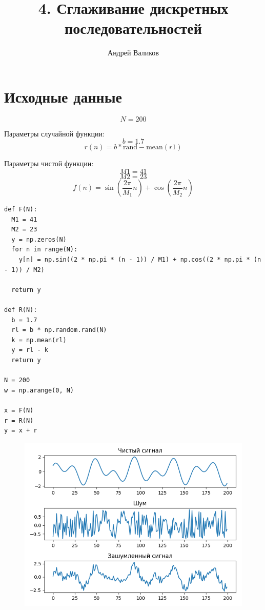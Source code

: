 \documentclass[12pt]{article}
\begin{document}
\title{4. Сглаживание дискретных последовательностей}
\author{Андрей Валиков}
\date{}
\maketitle
																																																								\section{Исходные данные}
		   																																																						
\[N = 200\]  
	
	  
Параметры случайной функции:
\[b = 1.7\]
\[r(n)= b * \textrm{rand} - \textrm{mean}(r1)\]	


Параметры чистой функции:
\[M1 = 41\]
\[M2 = 23\]
\[f(n)=\sin\left(\frac{2\pi}{M_1}n\right) + \cos\left(\frac{2\pi}{M_2}n\right)\]



\begin{lstlisting}
def F(N):
  M1 = 41
  M2 = 23
  y = np.zeros(N)
  for n in range(N):
    y[n] = np.sin((2 * np.pi * (n - 1)) / M1) + np.cos((2 * np.pi * (n - 1)) / M2)

  return y
  
def R(N):
  b = 1.7
  rl = b * np.random.rand(N)
  k = np.mean(rl)
  y = rl - k
  return y

N = 200
w = np.arange(0, N)

x = F(N)
r = R(N)
y = x + r
\end{lstlisting}

\begin{figure}[!htb]
\centering
\includegraphics[scale=1.00]{initial.png}
\caption{}
\label{}
\end{figure}
\end{document}
